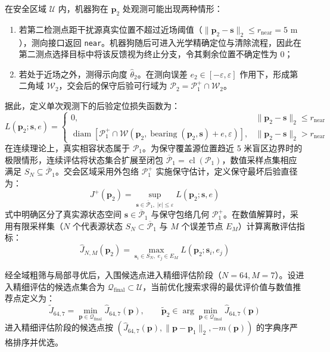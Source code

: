 \documentclass[zihao=-4,a4paper,UTF8]{ctexart}
\begin{document}
在安全区域 $\mathcal{U}$ 内，机器狗在 $\mathbf{p}_2$ 处观测可能出现两种情形：
\begin{enumerate}[leftmargin=2.5em, itemsep=0.2em]
    \item 若第二检测点距干扰源真实位置不超过近场阈值（$\|\mathbf{p}_2 - \mathbf{s}\|_2 \le r_{\text{near}} = 5\text{ m}$），测向接口返回 \texttt{near}。机器狗随后可进入光学精确定位与清除流程，因此在第二测点选择目标中将该反馈视为终止分支，令其剩余位置不确定性为 $0$；
    \item 若处于近场之外，测得示向度 $\hat\theta_2$。在测向误差 $e_2 \in [-\varepsilon, \varepsilon]$ 作用下，形成第二角域 $\mathcal{W}_2$，交会后的保守后验可行域为 $\mathcal{P}_2 = \mathcal{P}_1^+ \cap \mathcal{W}_2$。
\end{enumerate}

据此，定义单次观测下的后验定位损失函数为：
\begin{equation}
    L(\mathbf{p}_2; \mathbf{s}, e) = \begin{cases}
        0, & \|\mathbf{p}_2 - \mathbf{s}\|_2 \le r_{\text{near}} \\
        \operatorname{diam}\left[ \mathcal{P}_1^+ \cap \mathcal{W}\left(\mathbf{p}_2, \operatorname{bearing}(\mathbf{p}_2, \mathbf{s}) + e, \varepsilon\right) \right], & \|\mathbf{p}_2 - \mathbf{s}\|_2 > r_{\text{near}}
    \end{cases}
\end{equation}
在连续理论上，真实相容状态属于 $\mathcal{P}_1$。为保守覆盖源位置趋近 5 米盲区边界时的极限情形，连续评估将状态集合扩展至闭包 $\overline{\mathcal{P}}_1 = \operatorname{cl}(\mathcal{P}_1)$，数值采样点集相应满足 $S_N \subseteq \overline{\mathcal{P}}_1$。交会区域采用外包络 $\mathcal{P}_1^+$ 实施保守估计，定义保守最坏后验直径为：
\begin{equation}
    J^+(\mathbf{p}_2) = \sup_{\mathbf{s} \in \overline{\mathcal{P}}_1,\; |e| \le \varepsilon} L(\mathbf{p}_2; \mathbf{s}, e)
\end{equation}
式中明确区分了真实源状态空间 $\mathbf{s} \in \overline{\mathcal{P}}_1$ 与保守包络几何 $\mathcal{P}_1^+$。在数值解算时，采用有限采样集（$N$ 个代表源状态 $S_N \subset \overline{\mathcal{P}}_1$ 与 $M$ 个误差节点 $E_M$）计算离散评估指标：
\begin{equation}
    \widehat{J}_{N,M}(\mathbf{p}_2) = \max_{\mathbf{s}_i \in S_N,\; e_j \in E_M} L(\mathbf{p}_2; \mathbf{s}_i, e_j)
\end{equation}

经全域粗筛与局部寻优后，入围候选点进入精细评估阶段（$N=64, M=7$）。设进入精细评估的候选点集合为 $\mathcal{Q}_{\text{final}} \subset \mathcal{U}$，当前优化搜索求得的最优评价值与数值推荐点定义为：
\begin{equation}
    \widetilde{J}_{64,7} = \min_{\mathbf{p} \in \mathcal{Q}_{\text{final}}} \widehat{J}_{64,7}(\mathbf{p}), \qquad \widetilde{\mathbf{p}}_2 \in \arg\min_{\mathbf{p} \in \mathcal{Q}_{\text{final}}} \widehat{J}_{64,7}(\mathbf{p})
\end{equation}
进入精细评估阶段的候选点按 $(\widehat{J}_{64,7}(\mathbf{p}), \|\mathbf{p} - \mathbf{p}_1\|_2, -m(\mathbf{p}))$ 的字典序严格排序并优选。
\end{document}

